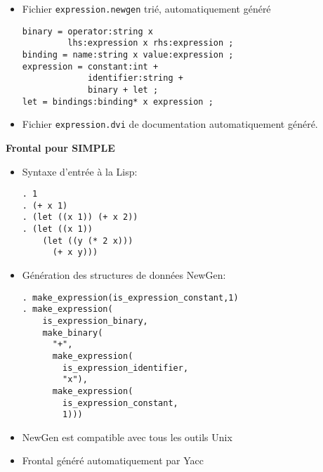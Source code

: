 \documentclass[11pt]{article}
\begin{document}
{\begin{itemize}
\begin{verbatim}
\domain{binary = operator:string x 
                 lhs:expression x
                 rhs:expression ;} {
A binary expression consists of an operator 
and two subexpressions.
}

\domain{let = bindings:binding* x 
              expression ;} {
A let construct includes a binding list and 
a body expression.
}

\domain{binding = name:string x 
                  value:expression ;} {
A binding binds a name to a value.
}
\end{verbatim}
\item Fichier {\tt expression.newgen} trié, automatiquement généré

\begin{verbatim}
binary = operator:string x 
         lhs:expression x rhs:expression ;
binding = name:string x value:expression ;
expression = constant:int + 
             identifier:string +
             binary + let ;
let = bindings:binding* x expression ;
\end{verbatim}

\item Fichier {\tt expression.dvi} de documentation automatiquement
généré. 
\end{itemize}

\newpage

\begin{center}
{\huge\bf Frontal pour SIMPLE}
\end{center}

\vskip 2cm

\begin{itemize}
\item Syntaxe d'entrée à la Lisp:

\begin{verbatim}
. 1
. (+ x 1)
. (let ((x 1)) (+ x 2))
. (let ((x 1))
    (let ((y (* 2 x)))
      (+ x y)))
\end{verbatim}
\item Génération des structures de données NewGen:

\begin{verbatim}
. make_expression(is_expression_constant,1)
. make_expression( 
    is_expression_binary,
    make_binary( 
      "+",
      make_expression( 
        is_expression_identifier,
        "x"),
      make_expression( 
        is_expression_constant,
        1)))
\end{verbatim}
\item NewGen est compatible avec tous les outils Unix
\item Frontal généré automatiquement par Yacc
\end{itemize}

}
\end{document}
